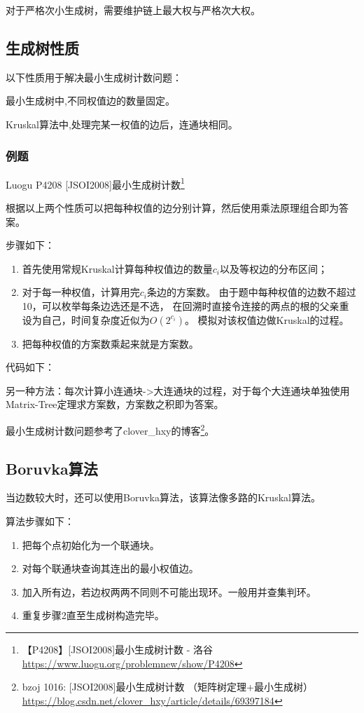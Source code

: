 对于严格次小生成树，需要维护链上最大权与严格次大权。

\subsection{生成树性质}
以下性质用于解决最小生成树计数问题：
\begin{property}
	最小生成树中,不同权值边的数量固定。
\end{property}
\begin{property}
	Kruskal算法中,处理完某一权值的边后，连通块相同。
\end{property}
\subsubsection{例题}

Luogu P4208 [JSOI2008]最小生成树计数\footnote{
【P4208】[JSOI2008]最小生成树计数 - 洛谷
\url{https://www.luogu.org/problemnew/show/P4208}
}

根据以上两个性质可以把每种权值的边分别计算，然后使用乘法原理组合即为答案。

步骤如下：
\begin{enumerate}
	\item 首先使用常规Kruskal计算每种权值边的数量$c_i$以及等权边的分布区间；
	\item 对于每一种权值，计算用完$c_i$条边的方案数。
	      由于题中每种权值的边数不超过10，可以枚举每条边选还是不选，
          在回溯时直接令连接的两点的根的父亲重设为自己，时间复杂度近似为$O(2^{c_i})$。
          模拟对该权值边做Kruskal的过程。
	\item 把每种权值的方案数乘起来就是方案数。
\end{enumerate}

代码如下：


另一种方法：每次计算小连通块->大连通块的过程，对于每个大连通块单独使用
Matrix-Tree定理求方案数，方案数之积即为答案。

最小生成树计数问题参考了clover\_hxy的博客\footnote{
bzoj 1016: [JSOI2008]最小生成树计数 （矩阵树定理+最小生成树）
\url{https://blog.csdn.net/clover\_hxy/article/details/69397184}
}。
\subsection{Boruvka算法}
当边数较大时，还可以使用Boruvka算法，该算法像多路的Kruskal算法。

算法步骤如下：
\begin{enumerate}
    \item 把每个点初始化为一个联通块。
    \item 对每个联通块查询其连出的最小权值边。
    \item 加入所有边，若边权两两不同则不可能出现环。一般用并查集判环。
    \item 重复步骤2直至生成树构造完毕。
\end{enumerate}

